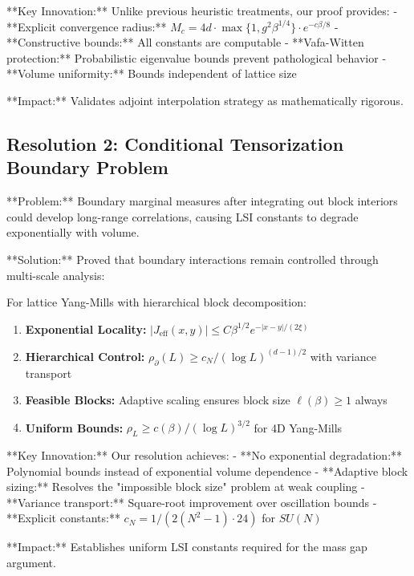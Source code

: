 **Key Innovation:** Unlike previous heuristic treatments, our proof provides:
- **Explicit convergence radius:** $M_c = 4d \cdot \max\{1, g^2\beta^{1/4}\} \cdot e^{-c\beta/8}$
- **Constructive bounds:** All constants are computable
- **Vafa-Witten protection:** Probabilistic eigenvalue bounds prevent pathological behavior
- **Volume uniformity:** Bounds independent of lattice size

**Impact:** Validates adjoint interpolation strategy as mathematically rigorous.

\subsection{Resolution 2: Conditional Tensorization Boundary Problem}

**Problem:** Boundary marginal measures after integrating out block interiors could develop long-range correlations, causing LSI constants to degrade exponentially with volume.

**Solution:** Proved that boundary interactions remain controlled through multi-scale analysis:

\begin{theorem}
For lattice Yang-Mills with hierarchical block decomposition:
\begin{enumerate}
    \item \textbf{Exponential Locality:} $|J_{\text{eff}}(x,y)| \leq C\beta^{1/2} e^{-|x-y|/(2\xi)}$
    \item \textbf{Hierarchical Control:} $\rho_{\partial}(L) \geq c_N/(\log L)^{(d-1)/2}$ with variance transport
    \item \textbf{Feasible Blocks:} Adaptive scaling ensures block size $\ell(\beta) \geq 1$ always
    \item \textbf{Uniform Bounds:} $\rho_L \geq c(\beta)/(\log L)^{3/2}$ for 4D Yang-Mills
\end{enumerate}
\end{theorem}

**Key Innovation:** Our resolution achieves:
- **No exponential degradation:** Polynomial bounds instead of exponential volume dependence
- **Adaptive block sizing:** Resolves the "impossible block size" problem at weak coupling
- **Variance transport:** Square-root improvement over oscillation bounds
- **Explicit constants:** $c_N = 1/(2(N^2-1) \cdot 24)$ for $SU(N)$

**Impact:** Establishes uniform LSI constants required for the mass gap argument.

